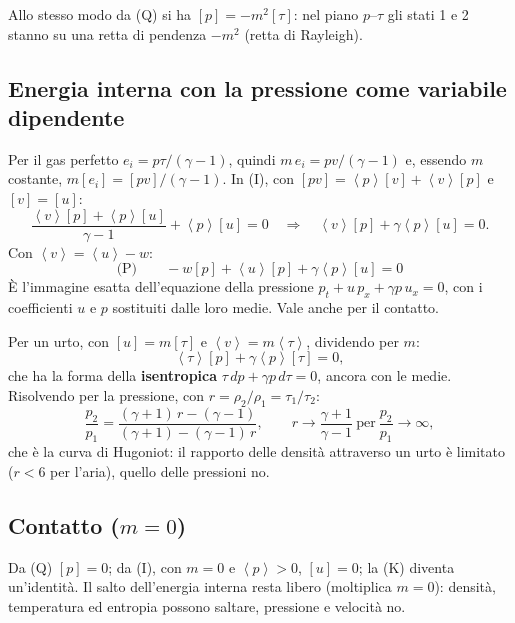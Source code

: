 \documentclass[11pt,a4paper]{article}
\newcommand{\jp}[1]{\left[#1\right]}            %
\newcommand{\av}[1]{\left\langle #1\right\rangle} %
\begin{document}
Allo stesso modo da (Q) si ha $\jp{p}=-m^2\jp{\tau}$: nel piano $p$--$\tau$ gli stati 1 e 2 stanno su una retta di
pendenza $-m^2$ (retta di Rayleigh).

\subsection{Energia interna con la pressione come variabile dipendente}
Per il gas perfetto $e_i=p\tau/(\gamma-1)$, quindi $m\,e_i=pv/(\gamma-1)$ e, essendo $m$ costante,
$m\jp{e_i}=\jp{pv}/(\gamma-1)$. In (I), con $\jp{pv}=\av{p}\jp{v}+\av{v}\jp{p}$ e $\jp{v}=\jp{u}$:
\[
  \frac{\av{v}\jp{p}+\av{p}\jp{u}}{\gamma-1}+\av{p}\jp{u}=0
  \quad\Longrightarrow\quad
  \av{v}\jp{p}+\gamma\av{p}\jp{u}=0 .
\]
Con $\av{v}=\av{u}-w$:
\[
  \boxed{\ \text{(P)}\qquad -w\jp{p}+\av{u}\jp{p}+\gamma\av{p}\jp{u}=0\ }
\]
È l'immagine esatta dell'equazione della pressione $p_t+u\,p_x+\gamma p\,u_x=0$, con i coefficienti $u$ e $p$
sostituiti dalle loro medie. Vale anche per il contatto.

Per un urto, con $\jp{u}=m\jp{\tau}$ e $\av{v}=m\av{\tau}$, dividendo per $m$:
\[
  \av{\tau}\jp{p}+\gamma\av{p}\jp{\tau}=0 ,
\]
che ha la forma della \textbf{isentropica} $\tau\,dp+\gamma p\,d\tau=0$, ancora con le medie. Risolvendo per la
pressione, con $r=\rho_2/\rho_1=\tau_1/\tau_2$:
\[
  \frac{p_2}{p_1}=\frac{(\gamma+1)\,r-(\gamma-1)}{(\gamma+1)-(\gamma-1)\,r},
  \qquad r\to\frac{\gamma+1}{\gamma-1}\ \text{per}\ \frac{p_2}{p_1}\to\infty ,
\]
che è la curva di Hugoniot: il rapporto delle densità attraverso un urto è limitato ($r<6$ per l'aria), quello
delle pressioni no.

\subsection{Contatto ($m=0$)}
Da (Q) $\jp{p}=0$; da (I), con $m=0$ e $\av{p}>0$, $\jp{u}=0$; la (K) diventa un'identità. Il salto
dell'energia interna resta libero (moltiplica $m=0$): densità, temperatura ed entropia possono saltare, pressione
e velocità no.
\end{document}
